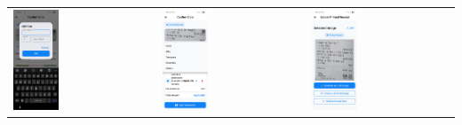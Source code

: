 \begin{tabular}{lll}
    \\
    \includegraphics[width=0.33\textwidth]{images/UI/struk-add.jpg} &
    \includegraphics[width=0.33\textwidth]{images/UI/struk-cat.jpg} &
    \includegraphics[width=0.33\textwidth]{images/UI/struk-confirm.jpg} \\
\end{tabular}

